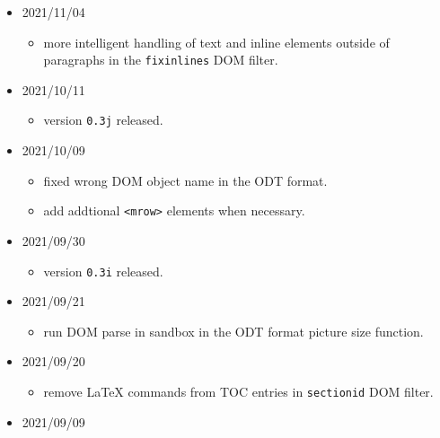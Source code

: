 \begin{itemize}
  \begin{itemize}
  \tightlist
  \item
    don't put \texttt{\textless{}mrow\textgreater{}} as children of
    \texttt{\textless{}mrow\textgreater{}} in the \texttt{mathmlfixes}
    DOM filter.
  \end{itemize}
\item
  2021/11/04

  \begin{itemize}
  \tightlist
  \item
    more intelligent handling of text and inline elements outside of
    paragraphs in the \texttt{fixinlines} DOM filter.
  \end{itemize}
\item
  2021/10/11

  \begin{itemize}
  \tightlist
  \item
    version \texttt{0.3j} released.
  \end{itemize}
\item
  2021/10/09

  \begin{itemize}
  \tightlist
  \item
    fixed wrong DOM object name in the ODT format.
  \item
    add addtional \texttt{\textless{}mrow\textgreater{}} elements when
    necessary.
  \end{itemize}
\item
  2021/09/30

  \begin{itemize}
  \tightlist
  \item
    version \texttt{0.3i} released.
  \end{itemize}
\item
  2021/09/21

  \begin{itemize}
  \tightlist
  \item
    run DOM parse in sandbox in the ODT format picture size function.
  \end{itemize}
\item
  2021/09/20

  \begin{itemize}
  \tightlist
  \item
    remove LaTeX commands from TOC entries in \texttt{sectionid} DOM
    filter.
  \end{itemize}
\item
  2021/09/09


\end{itemize}
